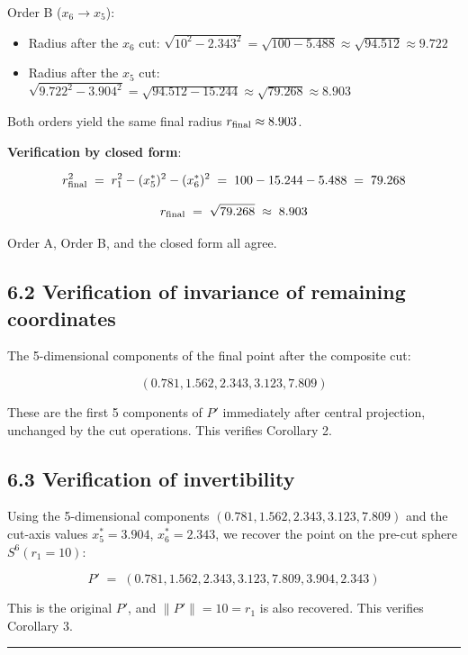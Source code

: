 \documentclass[a4paper,11pt]{article}
\theoremstyle{definition}
\theoremstyle{remark}
\providecommand{\tightlist}{%
  \setlength{\itemsep}{0pt}\setlength{\parskip}{0pt}}
\begin{document}
Order B (\(x_6 \to x_5\)):

\begin{itemize}
\tightlist
\item
  Radius after the \(x_6\) cut:
  \(\sqrt{10^2 - 2.343^2} = \sqrt{100 - 5.488} \approx \sqrt{94.512} \approx 9.722\)
\item
  Radius after the \(x_5\) cut:
  \(\sqrt{9.722^2 - 3.904^2} = \sqrt{94.512 - 15.244} \approx \sqrt{79.268} \approx 8.903\)
\end{itemize}

Both orders yield the same final radius \(r_{\rm final} \approx 8.903\).

\textbf{Verification by closed form}:

\[
r_{\rm final}^{2} \;=\; r_{1}^{2} - (x_5^{*})^{2} - (x_6^{*})^{2} \;=\; 100 - 15.244 - 5.488 \;=\; 79.268
\]

\[
r_{\rm final} \;=\; \sqrt{79.268} \;\approx\; 8.903
\]

Order A, Order B, and the closed form all agree.

\subsection{6.2 Verification of invariance of remaining
coordinates}\label{verification-of-invariance-of-remaining-coordinates}

The 5-dimensional components of the final point after the composite cut:

\[
(0.781, 1.562, 2.343, 3.123, 7.809)
\]

These are the first 5 components of \(P'\) immediately after central
projection, unchanged by the cut operations. This verifies Corollary 2.

\subsection{6.3 Verification of
invertibility}\label{verification-of-invertibility}

Using the 5-dimensional components
\((0.781, 1.562, 2.343, 3.123, 7.809)\) and the cut-axis values
\(x_5^{*} = 3.904\), \(x_6^{*} = 2.343\), we recover the point on the
pre-cut sphere \(S^6(r_1 = 10)\):

\[
P' \;=\; (0.781, 1.562, 2.343, 3.123, 7.809, 3.904, 2.343)
\]

This is the original \(P'\), and \(\lVert P' \rVert = 10 = r_1\) is also
recovered. This verifies Corollary 3.

\begin{center}\rule{0.5\linewidth}{0.5pt}\end{center}
\end{document}
